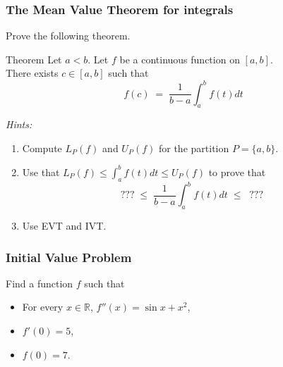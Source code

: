 \begin{frame}[t]
	\fontsize{13}{13}\selectfont
	\frametitle{The Mean Value Theorem for integrals}

	Prove the following theorem.

	\begin{block}{\fontsize{13}{13}\selectfont Theorem}
		Let $a < b$. Let $f$ be a continuous function on $[a,b]$. \\ There exists $c
		\in [a,b]$ such that
		\vspace{-.5cm}
		\[
			f(c) \; = \; \frac{1}{b-a}\int_{a}^{b}f(t) dt
		\]
	\end{block}


	\emph{Hints:}
	\begin{enumerate}
		\item Compute $L_{P}(f)$ and $U_{P}(f)$ for the partition $\displaystyle P=\{
			a,b\}$.

		\item Use that $\displaystyle L_{P}(f) \leq \int_{a}^{b}f(t)dt \leq U_{P}(f)$
			to prove that
			\vspace{-.6cm}
			\
			\[
				??? \; \leq \; \frac{1}{b-a}\int_{a}^{b}f(t) dt \; \leq \; \; ???
			\]
			\vspace{-.6cm}

		\item Use EVT and IVT.
	\end{enumerate}
\end{frame}

\begin{frame}[t]
	\frametitle{Initial Value Problem}

	Find a function $f$ such that
	\begin{itemize}
		\item For every $\displaystyle x \in \mathbb{R}$,
			$\displaystyle f''(x) = \sin x + x^{2}$,

		\item $\displaystyle f'(0) = 5$,

		\item $\displaystyle f(0) = 7$.
	\end{itemize}
\end{frame}

